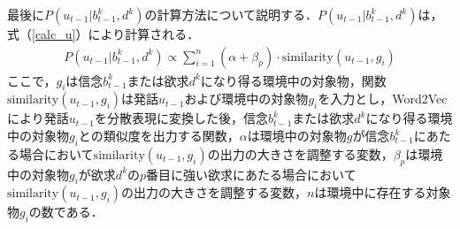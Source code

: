 \par
最後に$P(u_{t-1}|b_{t-1}^k,d^k)$の計算方法について説明する．$P(u_{t-1}|b_{t-1}^k,d^k)$は，式（\ref{calc_u}）により計算される．
\begin{equation}
  \begin{split}
  \label{calc_u}
  P(u_{t-1}|b_{t-1}^k,d^k)\propto \sum_{i=1}^n(\alpha+\beta_p)\cdot\mathrm{similarity}(u_{t-1},g_i)
  \end{split}
\end{equation}
ここで，$g_i$は信念$b_{t-1}^k$または欲求$d^k$になり得る環境中の対象物，関数$\mathrm{similarity}(u_{t-1},g_i)$は発話$u_{t-1}$および環境中の対象物$g_i$を入力とし，Word2Vec \cite{mikolov2013efficient}により発話$u_{t-1}$を分散表現に変換した後，信念$b_{t-1}^k$または欲求$d^k$になり得る環境中の対象物$g_i$との類似度を出力する関数，$\alpha$は環境中の対象物$g$が信念$b_{t-1}^k$にあたる場合において$\mathrm{similarity}(u_{t-1},g_i)$の出力の大きさを調整する変数，$\beta_p$は環境中の対象物$g_i$が欲求$d^k$の$p$番目に強い欲求にあたる場合において$\mathrm{similarity}(u_{t-1},g_i)$の出力の大きさを調整する変数，$n$は環境中に存在する対象物$g_i$の数である．
